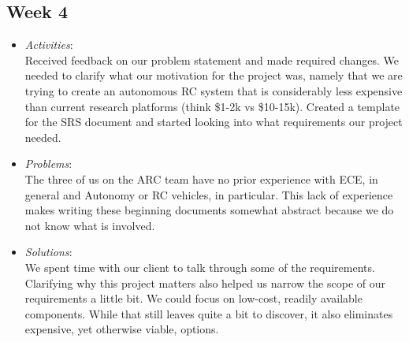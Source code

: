 \documentclass[compsoc,draftclsnofoot,onecolumn,10pt]{IEEEtran}
\begin{document}
\subsection{Week 4}
	\begin{itemize}
        \item \textit{Activities}:\\
            Received feedback on our problem statement and made required
            changes. We needed to clarify what our motivation for the project
            was, namely that we are trying to create an autonomous RC system
            that is considerably less expensive than current research platforms
            (think \$1-2k vs \$10-15k). Created a template for the SRS document
            and started looking into what requirements our project needed.

        \item \textit{Problems}:\\
            The three of us on the ARC team have no prior experience with ECE,
            in general and Autonomy or RC vehicles, in particular. This lack of
            experience makes writing these beginning documents somewhat abstract
            because we do not know what is involved.

        \item \textit{Solutions}:\\
            We spent time with our client to talk through some of the
            requirements. Clarifying why this project matters also helped us
            narrow the scope of our requirements a little bit. We could focus on
            low-cost, readily available components. While that still leaves
            quite a bit to discover, it also eliminates expensive, yet otherwise
            viable, options.

	\end{itemize}
   
\end{document}
